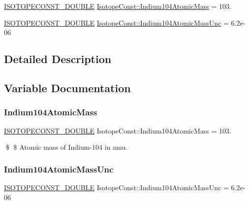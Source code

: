 \begin{DoxyCompactItemize}
\item 
\mbox{\hyperlink{group___isotope_const-_macros_ga8f45a7272ce02c0b4c65c44636ed719a}{I\+S\+O\+T\+O\+P\+E\+C\+O\+N\+S\+T\+\_\+\+D\+O\+U\+B\+LE}} \mbox{\hyperlink{group___isotope_const-_indium-_in104_ga94b7734e9e91c3c3a8f75393a83e05bc}{Isotope\+Const\+::\+Indium104\+Atomic\+Mass}} = 103.
\item 
\mbox{\hyperlink{group___isotope_const-_macros_ga8f45a7272ce02c0b4c65c44636ed719a}{I\+S\+O\+T\+O\+P\+E\+C\+O\+N\+S\+T\+\_\+\+D\+O\+U\+B\+LE}} \mbox{\hyperlink{group___isotope_const-_indium-_in104_gaa0170ad938be162752dab82ce51b7448}{Isotope\+Const\+::\+Indium104\+Atomic\+Mass\+Unc}} = 6.\+2e-\/06
\end{DoxyCompactItemize}


\subsection{Detailed Description}


\subsection{Variable Documentation}
\mbox{\label{group___isotope_const-_indium-_in104_ga94b7734e9e91c3c3a8f75393a83e05bc}} 
\subsubsection{\texorpdfstring{Indium104\+Atomic\+Mass}{Indium104AtomicMass}}
{\footnotesize\ttfamily \mbox{\hyperlink{group___isotope_const-_macros_ga8f45a7272ce02c0b4c65c44636ed719a}{I\+S\+O\+T\+O\+P\+E\+C\+O\+N\+S\+T\+\_\+\+D\+O\+U\+B\+LE}} Isotope\+Const\+::\+Indium104\+Atomic\+Mass = 103.}

\$ \$ Atomic mass of Indium-\/104 in amu. \mbox{\label{group___isotope_const-_indium-_in104_gaa0170ad938be162752dab82ce51b7448}} 
\subsubsection{\texorpdfstring{Indium104\+Atomic\+Mass\+Unc}{Indium104AtomicMassUnc}}
{\footnotesize\ttfamily \mbox{\hyperlink{group___isotope_const-_macros_ga8f45a7272ce02c0b4c65c44636ed719a}{I\+S\+O\+T\+O\+P\+E\+C\+O\+N\+S\+T\+\_\+\+D\+O\+U\+B\+LE}} Isotope\+Const\+::\+Indium104\+Atomic\+Mass\+Unc = 6.\+2e-\/06}

